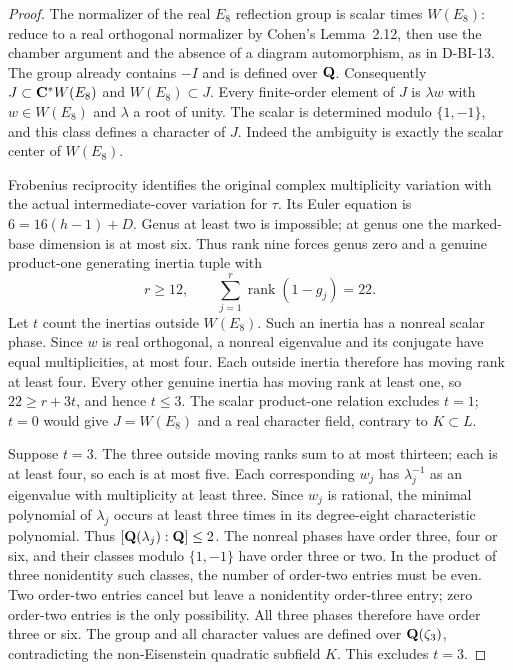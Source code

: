 \begin{proof}
The normalizer of the real $E_8$ reflection group is scalar times
$W(E_8)$: reduce to a real orthogonal normalizer by Cohen's
Lemma~2.12, then use the chamber argument and the absence of
a diagram automorphism, as in D-BI-13. The group already contains
$-I$ and is defined over $\mathbf Q$. Consequently
$J\subset\mathbf C^*W(E_8)$ and $W(E_8)\subset J$.
Every finite-order element of $J$ is $\lambda w$ with $w\in W(E_8)$
and $\lambda$ a root of unity. The scalar is determined modulo
$\{1,-1\}$, and this class defines a character of $J$.
Indeed the ambiguity is exactly the scalar center of $W(E_8)$.

Frobenius reciprocity identifies the original complex multiplicity
variation with the actual intermediate-cover variation for $\tau$.
Its Euler equation is $6=16(h-1)+D$. Genus at least two is impossible;
at genus one the marked-base dimension is at most six. Thus rank nine
forces genus zero and a genuine product-one generating inertia tuple
with
\[
             r\ge12,\qquad\sum_{j=1}^r\operatorname{rank}(1-g_j)=22.
                                                               \tag{E8IF.4}
\]
Let $t$ count the inertias outside $W(E_8)$. Such an inertia has a
nonreal scalar phase. Since $w$ is real orthogonal, a nonreal
eigenvalue and its conjugate have equal multiplicities, at most four.
Each outside inertia therefore has moving rank at least four.
Every other genuine inertia has moving rank at least one, so
$22\ge r+3t$, and hence $t\le3$.
The scalar product-one relation excludes $t=1$; $t=0$ would give
$J=W(E_8)$ and a real character field, contrary to $K\subset L$.

Suppose $t=3$. The three outside moving ranks sum to at most thirteen;
each is at least four, so each is at most five. Each corresponding
$w_j$ has $\lambda_j^{-1}$ as an eigenvalue with multiplicity at
least three. Since $w_j$ is rational, the minimal polynomial of
$\lambda_j$ occurs at least three times in its degree-eight
characteristic polynomial. Thus $[\mathbf Q(\lambda_j):\mathbf Q]\le2$.
The nonreal phases have order three, four or six, and their classes
modulo $\{1,-1\}$ have order three or two. In the product of three
nonidentity such classes, the number of order-two entries must be even.
Two order-two entries cancel but leave a nonidentity order-three entry;
zero order-two entries is the only possibility. All three phases
therefore have order three or six. The group and all character values
are defined over $\mathbf Q(\zeta_3)$, contradicting the non-Eisenstein
quadratic subfield $K$. This excludes $t=3$.


\end{proof}

